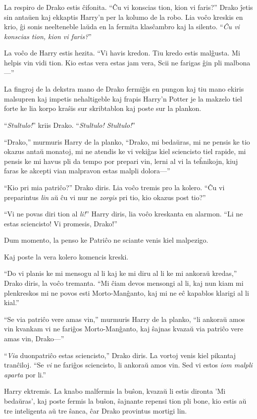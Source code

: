 La respiro de Drako estis ĉifonita. ``Ĉu vi konscias tion, kion vi
faris?'' Drako ĵetis sin antaŭen kaj ekkaptis Harry'n per la kolumo de
la robo. Lia voĉo kreskis en krio, ĝi sonis neelteneble laŭda en la
fermita klasĉambro kaj la silento. ``\emph{Ĉu vi konscias tion, kion
  vi faris?}''

La voĉo de Harry estis hezita. ``Vi havis kredon. Tiu kredo estis
malĝusta. Mi helpis vin vidi tion. Kio estas vera estas jam vera, Scii
ne farigas ĝin pli malbona—''

La fingroj de la dekstra mano de Drako fermiĝis en pungon kaj tiu mano
ekiris malsupren kaj impetis nehaltigeble kaj frapis Harry'n Potter je
la makzelo tiel forte ke lia korpo kraŝis sur skribtablon kaj poste
sur la plankon.

``\emph{Stultulo!}'' kriis Drako. ``\emph{Stultulo! Stultulo!}''

``Drako,'' murmuris Harry de la planko, ``Drako, mi bedaŭras, mi ne
pensis ke tio okazus antaŭ monatoj, mi ne atendis ke vi vekiĝas kiel
sciencisto tiel rapide, mi pensis ke mi havus pli da tempo por prepari
vin, lerni al vi la teĥnikojn, kiuj faras ke akcepti vian malpravon
estas malpli dolora—''

``Kio pri mia patriĉo?'' Drako diris. Lia voĉo tremis pro la kolero. ``Ĉu vi preparintus \emph{lin} aŭ ĉu vi nur ne \emph{zorgis} pri tio, kio okazus post tio?''

``Vi ne povas diri tion al \emph{li!}'' Harry diris, lia voĉo kreskanta en alarmon. ``Li ne estas sciencisto! Vi promesis, Drako!''

Dum momento, la penso ke Patriĉo ne sciante venis kiel malpezigo.

Kaj poste la vera kolero komencis kreski.

``Do vi planis ke mi mensogu al li kaj ke mi diru al li ke mi ankoraŭ
kredas,'' Drako diris, la voĉo tremanta. ``Mi ĉiam devos mensongi al
li, kaj nun kiam mi plenkreskos mi ne povos esti Morto-Manĝanto, kaj
mi ne eĉ kapablos klarigi al li kial.''

``Se via patriĉo vere amas vin,'' murmuris Harry de la planko, ``li
ankoraŭ amos vin kvankam vi ne fariĝos Morto-Manĝanto, kaj ŝajnas
kvazaŭ via patriĉo vere amas vin, Drako—''

``\emph{Via} duonpatriĉo estas sciencisto,'' Drako diris. La vortoj
venis kiel pikantaj tranĉiloj. ``Se \emph{vi} ne fariĝos sciencisto,
li ankoraŭ amos vin. Sed vi estos \emph{iom malpli aparta} por li.''

Harry ektremis. La knabo malfermis la buŝon, kvazaŭ li estis dironta
'Mi bedaŭras', kaj poste fermis la buŝon, ŝajnante repensi tion pli
bone, kio estis aŭ tre inteligenta aŭ tre ŝanca, ĉar Drako provintus
mortigi lin.

